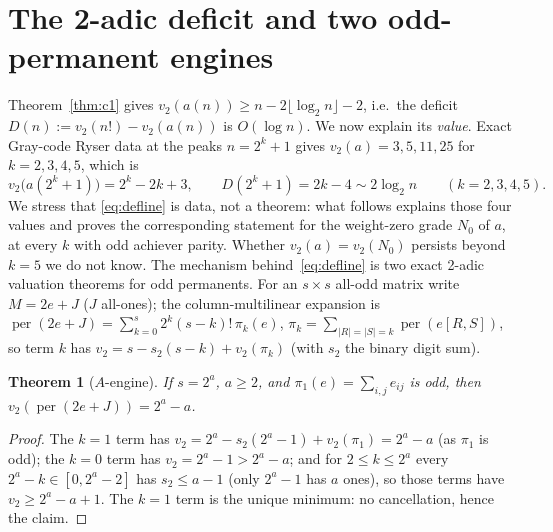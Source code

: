 \documentclass[11pt]{article}
\newtheorem{theorem}{Theorem}
\theoremstyle{remark}\newtheorem{remark}[theorem]{Remark}
\DeclareMathOperator{\perm}{per}
\begin{document}
\section{The 2-adic deficit and two odd-permanent engines}\label{sec:deficit}

Theorem~\ref{thm:c1} gives $v_2(a(n))\ge n-2\lfloor\log_2n\rfloor-2$, i.e.\ the deficit
$D(n):=v_2(n!)-v_2(a(n))$ is $O(\log n)$. We now explain its \emph{value}. Exact Gray-code Ryser data
at the peaks $n=2^k+1$ gives $v_2(a)=3,5,11,25$ for $k=2,3,4,5$, which is
\begin{equation}\label{eq:defline}
   v_2\big(a(2^k+1)\big)=2^k-2k+3,\qquad D(2^k+1)=2k-4\sim2\log_2 n
   \qquad(k=2,3,4,5).
\end{equation}
We stress that \eqref{eq:defline} is data, not a theorem: what follows explains those four values
and proves the corresponding statement for the weight-zero grade $N_0$ of $a$, at every $k$ with odd
achiever parity. Whether $v_2(a)=v_2(N_0)$ persists beyond $k=5$ we do not know.
The mechanism behind~\eqref{eq:defline} is two exact 2-adic valuation theorems for odd permanents.
For an $s\times s$ all-odd matrix write $M=2e+J$ ($J$ all-ones); the column-multilinear expansion is
$\perm(2e+J)=\sum_{k=0}^{s}2^k(s-k)!\,\pi_k(e)$, $\pi_k=\sum_{|R|=|S|=k}\perm(e[R,S])$, so term $k$ has
$v_2=s-s_2(s-k)+v_2(\pi_k)$ (with $s_2$ the binary digit sum).

\begin{theorem}[$A$-engine]\label{thm:engineA}
If $s=2^a$, $a\ge2$, and $\pi_1(e)=\sum_{i,j}e_{ij}$ is odd, then $v_2(\perm(2e+J))=2^a-a$.
\end{theorem}
\begin{proof}
The $k=1$ term has $v_2=2^a-s_2(2^a-1)+v_2(\pi_1)=2^a-a$ (as $\pi_1$ is odd); the $k=0$ term has
$v_2=2^a-1>2^a-a$; and for $2\le k\le2^a$ every $2^a-k\in[0,2^a-2]$ has $s_2\le a-1$ (only $2^a-1$ has
$a$ ones), so those terms have $v_2\ge2^a-a+1$. The $k=1$ term is the unique minimum: no cancellation,
hence the claim.
\end{proof}
\end{document}
